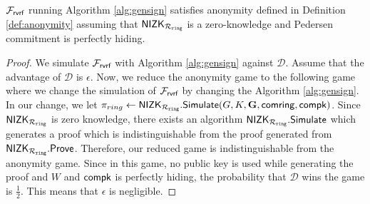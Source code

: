 %	

%	
%	


\begin{lemma} \label{lem:anonymity} $ \mathcal{F}_{\textsf{rvrf}} $ running Algorithm \ref{alg:gensign} satisfies anonymity defined in Definition \ref{def:anonymity} assuming that $ {\mathsf{NIZK}}_{\mathcal{R}_{\mathtt{ring}}} $ is a zero-knowledge and Pedersen commitment is perfectly hiding.
\end{lemma}

\begin{proof}
	We simulate $ \mathcal{F}_{\textsf{rvrf}} $ with Algorithm \ref{alg:gensign} against $ \mathcal{D} $. Assume that the advantage of $ \mathcal{D} $ is $ \epsilon $. Now, we reduce the anonymity game to the following game where we change the simulation of $ \mathcal{F}_{\textsf{rvrf}} $ by changing the Algorithm \ref{alg:gensign}. In our change, we let $ \pi_{ring} \leftarrow {\ensuremath{\mathsf{NIZK}}}_{\mathcal{R}_{\mathtt{ring}}}.\mathsf{Simulate}(G,K,{\mathbf{G}},\mathsf{comring}, \mathsf{compk}) $. Since $ {\mathsf{NIZK}}_{\mathcal{R}_{\mathtt{ring}}} $ is zero knowledge, there exists an algorithm  $ {\mathsf{NIZK}}_{\mathcal{R}_{\mathtt{ring}}}.\mathsf{Simulate} $ which generates a proof which is indistinguishable from the proof generated from $ {\mathsf{NIZK}}_{\mathcal{R}_{\mathtt{ring}}}.{\mathsf{Prove}} $. Therefore, our reduced game is indistinguishable from the anonymity game. Since in this game, no public key is used while generating the proof and $ W $ and $ \mathsf{compk} $ is perfectly hiding, the probability that  $ \mathcal{D} $ wins the game is $ \frac{1}{2} $. This means that $ \epsilon $ is negligible.		
\end{proof}

